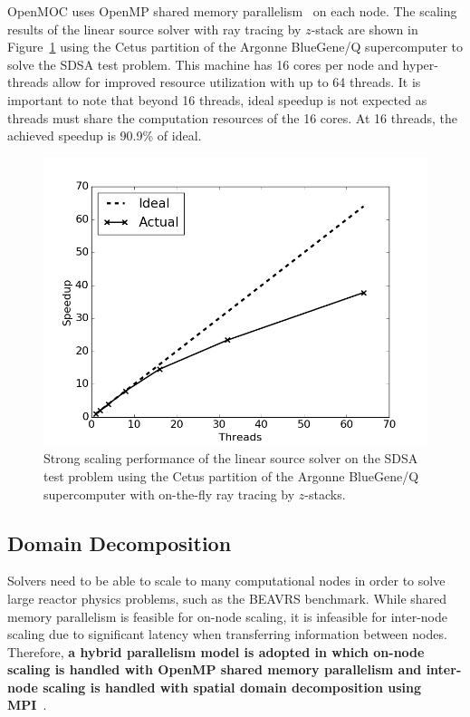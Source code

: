 \documentclass[12pt,twoside]{mitthesis-exec}
\begin{document}
OpenMOC uses OpenMP shared memory parallelism~\cite{openmp} on each node. The scaling results of the linear source solver with ray tracing by $z$-stack are shown in Figure~\ref{fig:rt-parallel-ls-cetus} using the Cetus partition of the Argonne BlueGene/Q supercomputer to solve the SDSA test problem. This machine has 16 cores per node and hyper-threads allow for improved resource utilization with up to 64 threads. It is important to note that beyond 16 threads, ideal speedup is not expected as threads must share the computation resources of the 16 cores. At 16 threads, the achieved speedup is 90.9\% of ideal.

\begin{figure}[ht!]
	\centering
	\includegraphics[width=0.75\linewidth]{figures/results/performance/ls-parallel-scaling-stacks-cetus.png}
	\caption{Strong scaling performance of the linear source solver on the SDSA test problem using the Cetus partition of the Argonne BlueGene/Q supercomputer with on-the-fly ray tracing by $z$-stacks.}
	\label{fig:rt-parallel-ls-cetus}
\end{figure}


\subsection*{Domain Decomposition}

Solvers need to be able to scale to many computational nodes in order to solve large reactor physics problems, such as the BEAVRS benchmark. While shared memory parallelism is feasible for on-node scaling, it is infeasible for inter-node scaling due to significant latency when transferring information between nodes. Therefore, \textbf{a hybrid parallelism model is adopted in which on-node scaling is handled with OpenMP shared memory parallelism and inter-node scaling is handled with spatial domain decomposition using MPI}~\cite{mpi}.
\end{document}
